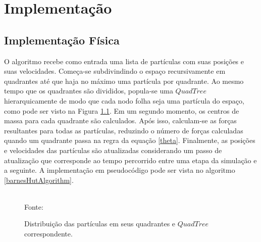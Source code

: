 \documentclass[rel_mlp]{iiufrgs}
\newcommand{\fonte}[1]{\\Fonte: {#1}}
\begin{document}
\chapter{Implementação}

\section{Implementação Física}

O algoritmo recebe como entrada uma lista de partículas com suas posições e suas velocidades. Começa-se subdivindindo o espaço recursivamente em quadrantes até que haja no máximo uma partícula por quadrante. Ao mesmo tempo que os quadrantes são divididos, popula-se uma $QuadTree$ hierarquicamente de modo que cada nodo folha seja uma partícula do espaço, como pode ser visto na Figura \ref{fig:quadtree.eps}. Em um segundo momento, os centros de massa para cada quadrante são calculados. Após isso, calculam-se as forças resultantes para todas as partículas, reduzindo o número de forças calculadas quando um quadrante passa na regra da equação \eqref{theta}. Finalmente, as posições e velocidades das partículas são atualizadas considerando um passo de atualização que corresponde ao tempo percorrido entre uma etapa da simulação e a seguinte. A implementação em pseudocódigo pode ser vista no algoritmo \ref{barnesHutAlgorithm}.


\begin{figure}[htb]
    \centering
    \caption{Distribuição das partículas em seus quadrantes e $QuadTree$ correspondente.}
    \label{fig:quadtree.eps}
    \fonte{\cite{galaxySimulator}}
\end{figure}
\end{document}
